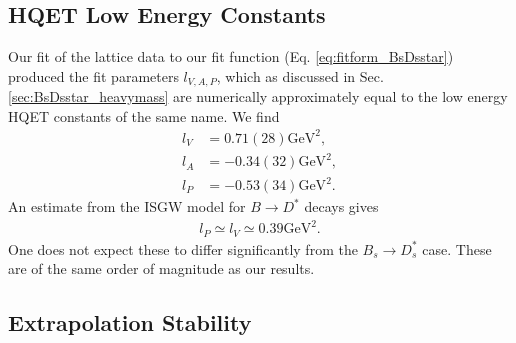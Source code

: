 \subsection{HQET Low Energy Constants}


Our fit of the lattice data to our fit function (Eq. \eqref{eq:fitform_BsDsstar}) produced the fit parameters $l_{V,A,P}$, which as discussed in Sec. \ref{sec:BsDsstar_heavymass} are numerically approximately equal to the low energy HQET constants of the same name. We find
\begin{align}
  \nonumber  l_V &= 0.71(28)\text{GeV}^2, \\  l_A &= -0.34(32)\text{GeV}^2, \label{eq:hqet_constants_hA1}
  \\ \nonumber l_P &= -0.53(34)\text{GeV}^2.
\end{align}
An estimate from the ISGW model for $B\to D^*$ decays gives \cite{PhysRevD.39.799}
\begin{align}
  l_P \simeq l_V \simeq 0.39\text{GeV}^2.
\end{align}
One does not expect these to differ significantly from the $B_s\to D_s^*$ case. These are of the same order of magnitude as our results.

\subsection{Extrapolation Stability}
\label{sec:stability_BsDsstar}

